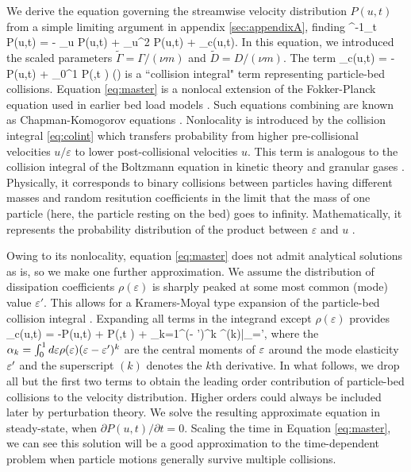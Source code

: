 We derive the equation governing the streamwise velocity distribution $P(u,t)$ from a simple limiting argument in appendix \ref{sec:appendixA}, finding
\be \nu^{-1}\partial_t P(u,t) = - \tilde{\Gamma} \partial_u P(u,t) +  \partial_u^2 P(u,t) + _c(u,t). \label{eq:master} \ee
In this equation, we introduced the scaled parameters $\tilde{\Gamma} = \Gamma/(\nu m)$ and $\tilde{D} = D/(\nu m)$. The term
\be {}_c(u,t) = - P(u,t) + \int_0^1 P\big(,t \big) \rho(\ve) \label{eq:colint} \ee
is a ``collision integral" term representing particle-bed collisions.
Equation \ref{eq:master} is a nonlocal extension of the Fokker-Planck equation used in earlier bed load models \citep{Fan2014,Ancey2014}. 
Such equations combining are known as Chapman-Komogorov equations \citep{Gardiner1983}. 
Nonlocality is introduced by the collision integral \ref{eq:colint} which transfers probability from higher pre-collisional velocities $u/\varepsilon$ to lower post-collisional velocities $u$.
This term is analogous to the collision integral of the Boltzmann equation in kinetic theory and granular gases \citep{Duderstadt1971, Brilliantov2004}. Physically, it corresponds to binary collisions between particles having different masses and random resitution coefficients \cite{Serero2015} in the limit that the mass of one particle (here, the particle resting on the bed) goes to infinity. Mathematically, it represents the probability distribution of the product between $\varepsilon$ and $u$ \citep[c.f.][]{Feller1968}.

Owing to its nonlocality, equation \ref{eq:master} does not admit analytical solutions as is, so we make one further approximation.
We assume the distribution of dissipation coefficients $\rho(\varepsilon)$ is sharply peaked at some most common (mode) value $\varepsilon'$. This allows for a Kramers-Moyal type expansion of the particle-bed collision integral \citep{Gardiner1983}.
Expanding all terms in the integrand except $\rho(\varepsilon)$ provides
\be {}_c(u,t) = -P(u,t) + P\big(,t \big) + \sum_{k=1}^\infty {}(\ve - \ve')^k ^{(k)}\Big|_{\ve=\ve'},\label{eq:expansion}\ee
where the $\alpha_k = \int_0^1 d\varepsilon \rho(\varepsilon) (\varepsilon-\varepsilon')^k $ are the central moments of $\varepsilon$ around the mode elasticity $\varepsilon'$ and the superscript $(k)$ denotes the $k$th derivative.
In what follows, we drop all but the first two terms to obtain the leading order contribution of particle-bed collisions to the velocity distribution. Higher orders could always be included later by perturbation theory. We solve the resulting approximate equation in steady-state, when $\partial P(u,t)/\partial t = 0$. Scaling the time in Equation \ref{eq:master}, we can see this solution will be a good approximation to the time-dependent problem when particle motions generally survive multiple collisions.

